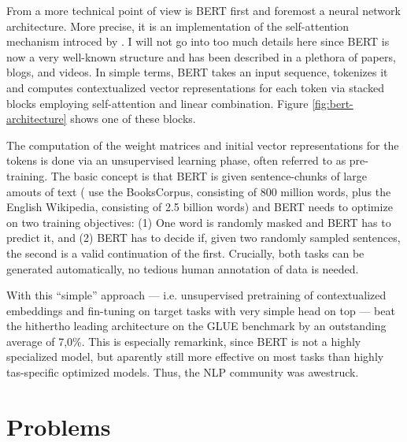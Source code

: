 From a more technical point of view is BERT first and foremost a neural network architecture. More precise, it is an
implementation of the self-attention mechanism introced by \cite{vaswani2017attention}. I will not go into
too much details here since BERT is now a very well-known structure and has been described in a
plethora of papers, blogs, and videos.
In simple terms, BERT takes an input sequence, tokenizes it and computes contextualized vector
representations for each token via stacked blocks employing self-attention and linear combination.
Figure \ref{fig:bert-architecture} shows one of these blocks.


The computation of the weight matrices and initial vector representations for the tokens is done
via an unsupervised learning phase, often referred to as pre-training. The basic concept is
that BERT is given sentence-chunks of large amouts of text (\citeauthor{devlin2018bert} use the BooksCorpus, consisting
of 800 million words, plus the English Wikipedia, consisting of 2.5 billion words) and BERT
needs to optimize on two training objectives: (1) One word is randomly masked and BERT has
to predict it, and (2) BERT has to decide if, given two randomly sampled sentences, the second
is a valid continuation of the first. Crucially, both tasks can be generated automatically, no
tedious human annotation of data is needed.

With this ``simple'' approach --- i.e. unsupervised pretraining of contextualized embeddings and
fin-tuning on target tasks with very simple head on top --- \citeauthor{devlin2018bert} beat the
hithertho leading architecture on the GLUE benchmark by an outstanding average of 7,0\%. This is
especially remarkink, since BERT is not a highly specialized model, but
aparently still more effective on most tasks than highly tas-specific optimized models.
Thus, the NLP community was awestruck.

\section{Problems}
\label{sec:problems}

